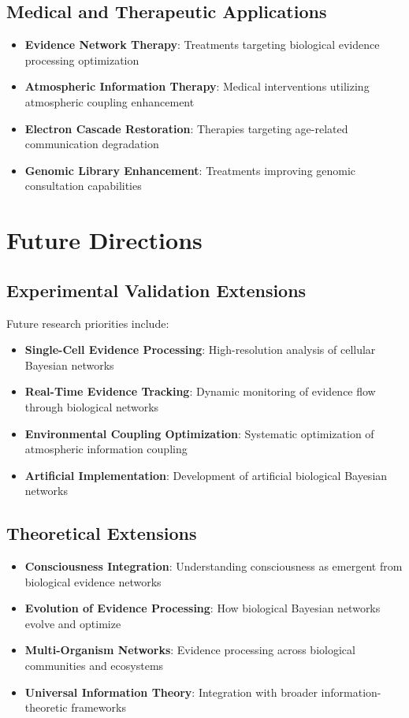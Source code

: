 \documentclass[12pt,a4paper]{article}
\begin{document}
\begin{table}[H]
\begin{table}[H]
\subsection{Medical and Therapeutic Applications}

\begin{itemize}
\item \textbf{Evidence Network Therapy}: Treatments targeting biological evidence processing optimization
\item \textbf{Atmospheric Information Therapy}: Medical interventions utilizing atmospheric coupling enhancement
\item \textbf{Electron Cascade Restoration}: Therapies targeting age-related communication degradation
\item \textbf{Genomic Library Enhancement}: Treatments improving genomic consultation capabilities
\end{itemize}

\section{Future Directions}

\subsection{Experimental Validation Extensions}

Future research priorities include:

\begin{itemize}
\item \textbf{Single-Cell Evidence Processing}: High-resolution analysis of cellular Bayesian networks
\item \textbf{Real-Time Evidence Tracking}: Dynamic monitoring of evidence flow through biological networks
\item \textbf{Environmental Coupling Optimization}: Systematic optimization of atmospheric information coupling
\item \textbf{Artificial Implementation}: Development of artificial biological Bayesian networks
\end{itemize}

\subsection{Theoretical Extensions}

\begin{itemize}
\item \textbf{Consciousness Integration}: Understanding consciousness as emergent from biological evidence networks
\item \textbf{Evolution of Evidence Processing}: How biological Bayesian networks evolve and optimize
\item \textbf{Multi-Organism Networks}: Evidence processing across biological communities and ecosystems
\item \textbf{Universal Information Theory}: Integration with broader information-theoretic frameworks
\end{itemize}


\end{table}
\end{table}
\end{document}
